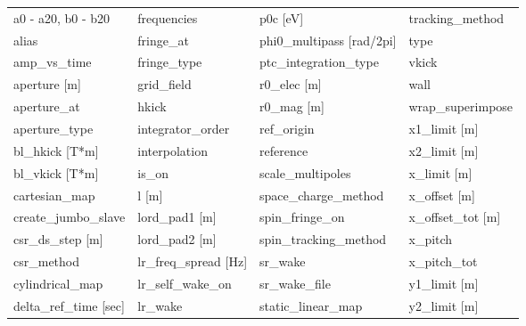  \begin{tabular}{llll} \toprule
a0 - a20, b0 - b20               & frequencies                      & p0c [eV]                         & tracking_method                  \\
alias                            & fringe_at                        & phi0_multipass [rad/2pi]         & type                             \\
amp_vs_time                      & fringe_type                      & ptc_integration_type             & vkick                            \\
aperture [m]                     & grid_field                       & r0_elec [m]                      & wall                             \\
aperture_at                      & hkick                            & r0_mag [m]                       & wrap_superimpose                 \\
aperture_type                    & integrator_order                 & ref_origin                       & x1_limit [m]                     \\
bl_hkick [T*m]                   & interpolation                    & reference                        & x2_limit [m]                     \\
bl_vkick [T*m]                   & is_on                            & scale_multipoles                 & x_limit [m]                      \\
cartesian_map                    & l [m]                            & space_charge_method              & x_offset [m]                     \\
create_jumbo_slave               & lord_pad1 [m]                    & spin_fringe_on                   & x_offset_tot [m]                 \\
csr_ds_step [m]                  & lord_pad2 [m]                    & spin_tracking_method             & x_pitch                          \\
csr_method                       & lr_freq_spread [Hz]              & sr_wake                          & x_pitch_tot                      \\
cylindrical_map                  & lr_self_wake_on                  & sr_wake_file                     & y1_limit [m]                     \\
delta_ref_time [sec]             & lr_wake                          & static_linear_map                & y2_limit [m]                     \\

\end{tabular}
